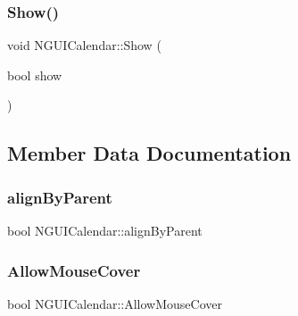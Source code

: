 \hypertarget{class_n_g_u_i_calendar_a24d8a3493ecd99c602b692be562055c1}{}\label{class_n_g_u_i_calendar_a24d8a3493ecd99c602b692be562055c1} 
\subsubsection{\texorpdfstring{Show()}{Show()}}
{\footnotesize\ttfamily void N\+G\+U\+I\+Calendar\+::\+Show (\begin{DoxyParamCaption}\item[{bool}]{show }\end{DoxyParamCaption})}



\subsection{Member Data Documentation}
\hypertarget{class_n_g_u_i_calendar_a2935a60950caccbdf65b7c9c638366d1}{}\label{class_n_g_u_i_calendar_a2935a60950caccbdf65b7c9c638366d1} 
\subsubsection{\texorpdfstring{align\+By\+Parent}{alignByParent}}
{\footnotesize\ttfamily bool N\+G\+U\+I\+Calendar\+::align\+By\+Parent}

\hypertarget{class_n_g_u_i_calendar_a04874d9a6ec96bac43a6c42d6493724b}{}\label{class_n_g_u_i_calendar_a04874d9a6ec96bac43a6c42d6493724b} 
\subsubsection{\texorpdfstring{Allow\+Mouse\+Cover}{AllowMouseCover}}
{\footnotesize\ttfamily bool N\+G\+U\+I\+Calendar\+::\+Allow\+Mouse\+Cover}

\hypertarget{class_n_g_u_i_calendar_aafa53a225f268ca1adac35d2d974afe1}{}\label{class_n_g_u_i_calendar_aafa53a225f268ca1adac35d2d974afe1} 
